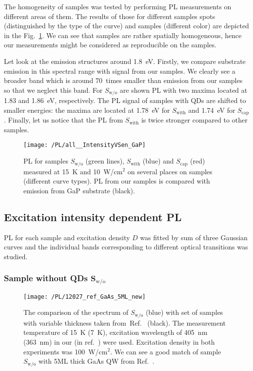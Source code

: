 The homogeneity of samples was tested by performing PL measurements on different areas of them. The results of those for different samples spots (distinguished by the type of the curve) and samples (different color) are depicted in the Fig.~\ref{fig:PL_homogenity}. We can see that samples are rather spatially homogeneous, hence our measurements might be considered as reproducible on the samples. %

Let look at the emission structures around 1.8~eV. Firstly, we compare substrate emission in this spectral range with signal from our samples. We clearly see a broader band which is around 70~times smaller than emission from our samples so that we neglect this band. For $S_\mathrm{w/o}$ are shown PL with two maxima located at 1.83 and 1.86~eV, respectively. The PL signal of samples with QDs are shifted to smaller energies: the maxima are located at 1.78~eV for $S_\mathrm{with}$ and 1.74~eV for $S_\mathrm{cap}$. Finally, let us notice that the PL from $S_\mathrm{with}$ is twice stronger compared to other samples.
\begin{figure}
	\centering
	\texttt{[image: /PL/all\_\_IntensityVSen\_GaP]}
	\caption{PL for samples $S_\mathrm{w/o}$ (green lines), $S_\mathrm{with}$ (blue) and $S_\mathrm{cap}$ (red) measured at 15~K and 10~W/cm$^2$ on several places on samples (different curve types). PL from our samples is compared with emission from GaP substrate (black).}
	\label{fig:PL_homogenity}
\end{figure}

\subsection{Excitation intensity dependent PL}
\label{sec:intensity_PL_TU}
PL for each sample and excitation density $D$ was fitted by sum of three Gaussian curves and the individual bands corresponding to different optical transitions was studied. 

\subsubsection*{Sample without QDs $\mathbf{S_\mathrm{w/o}}$}
\label{Sec:PL_int_wo}
\begin{figure}
	\centering
	\texttt{[image: /PL/12027\_ref\_GaAs\_5ML\_new]}
	\caption{The comparison of the spectrum of $S_\mathrm{w/o}$ (blue) with set of samples with variable thickness taken from~Ref.~\citep{Prieto_APL1997} (black). The measurement temperature of 15~K (7~K), excitation wavelength of 405~nm (363~nm) in our (in ref.~\citep{Prieto_APL1997}) were used. Excitation density in both experiments was 100~W/cm$^2$. We can see a good match of sample $S_\mathrm{w/o}$ with 5ML thick GaAs QW from Ref.~\citep{Prieto_APL1997}.}
	\label{fig:12027_ref}
\end{figure}


